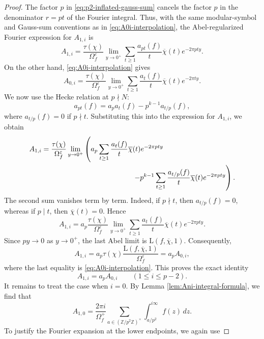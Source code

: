 \documentclass[11pt,table]{amsart}
\newcommand{\Z}{\mathbb{Z}}
\numberwithin{equation}{section}
\begin{document}
\begin{proof}
The factor \(p\) in \eqref{eq:p2-inflated-gauss-sum} cancels the factor
\(p\) in the denominator \(r=pt\) of the Fourier integral. Thus, with
the same modular-symbol and Gauss-sum conventions as in
\eqref{eq:A0i-interpolation}, the Abel-regularized Fourier expression
for \(A_{1,i}\) is
\[
        A_{1,i}
        =
        \frac{\tau(\chi)}{\Omega_f^\varepsilon}
        \lim_{y\to0^+}
        \sum_{t\geq1}
        \frac{a_{pt}(f)}{t}
        \overline{\chi}(t)e^{-2\pi pty}.
\]
On the other hand, \eqref{eq:A0i-interpolation} gives
\[
        A_{0,i}
        =
        \frac{\tau(\chi)}{\Omega_f^\varepsilon}
        \lim_{y\to0^+}
        \sum_{t\geq1}
        \frac{a_t(f)}{t}
        \overline{\chi}(t)e^{-2\pi ty}.
\]
We now use the Hecke relation at \(p\nmid N\):
\[
        a_{pt}(f)
        =
        a_pa_t(f)-p^{k-1}a_{t/p}(f),
\]
where \(a_{t/p}(f)=0\) if \(p\nmid t\). Substituting this into the
expression for \(A_{1,i}\), we obtain
\[
\begin{aligned}
        A_{1,i}
        &=
        \frac{\tau(\chi)}{\Omega_f^\varepsilon}
        \lim_{y\to0^+}
        \left(
        a_p
        \sum_{t\geq1}
        \frac{a_t(f)}{t}
        \overline{\chi}(t)e^{-2\pi pty}
        \right.\\
        &\hspace{45mm}\left.
        -
        p^{k-1}
        \sum_{t\geq1}
        \frac{a_{t/p}(f)}{t}
        \overline{\chi}(t)e^{-2\pi pty}
        \right).
\end{aligned}
\]
The second sum vanishes term by term. Indeed, if \(p\nmid t\), then
\(a_{t/p}(f)=0\), whereas if \(p\mid t\), then
\(\overline{\chi}(t)=0\). Hence
\[
        A_{1,i}
        =
        a_p\frac{\tau(\chi)}{\Omega_f^\varepsilon}
        \lim_{y\to0^+}
        \sum_{t\geq1}
        \frac{a_t(f)}{t}
        \overline{\chi}(t)e^{-2\pi pty}.
\]
Since \(py\to0\) as \(y\to0^+\), the last Abel limit is
\(\mathrm{L}(f,\overline{\chi},1)\). Consequently,
\[
        A_{1,i}
        =
        a_p\tau(\chi)
        \frac{\mathrm{L}(f,\overline{\chi},1)}
             {\Omega_f^\varepsilon}
        =
        a_pA_{0,i},
\]
where the last equality is \eqref{eq:A0i-interpolation}. This proves
the exact identity
\[
        A_{1,i}=a_pA_{0,i}
        \qquad
        (1\leq i\leq p-2).
\]
It remains to treat the case when \(i=0\). By Lemma \ref{lem:Ani-integral-formula}, we find that
\[
        A_{1,0}
        =
        \frac{2\pi i}{\Omega_f^+}
        \sum_{a\in(\Z/p^2\Z)^\times}
        \int_{a/p^2}^{i\infty}f(z)\,dz.
\]
To justify the Fourier expansion at the lower endpoints, we again use

\end{proof}
\end{document}
